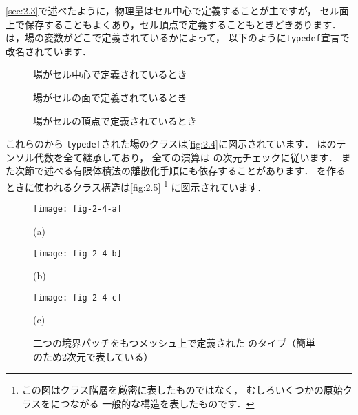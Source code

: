 \autoref{sec:2.3}で述べたように，物理量はセル中心で定義することが主ですが，
セル面上で保存することもよくあり，セル頂点で定義することもときどきあります．
は，場の変数がどこで定義されているかによって，
以下のように\texttt{typedef}宣言で改名されています．
\begin{description}
 \item[] 場がセル中心で定義されているとき
 \item[] 場がセルの面で定義されているとき
% 
 \item[] 場がセルの頂点で定義されているとき
\end{description}

これらのから
\texttt{typedef}された場のクラスは\autoref{fig:2.4}に図示されています．
はのテンソル代数を全て継承しており，
全ての演算は
%
%  
の次元チェックに従います．
また次節で述べる有限体積法の離散化手順にも依存することがあります．
を作るときに使われるクラス構造は\autoref{fig:2.5}%
\footnote{この図はクラス階層を厳密に表したものではなく，
むしろいくつかの原始クラスをにつながる
一般的な構造を表したものです．}%
に図示されています．


\begin{figure}[ht]
 \texttt{[image: fig-2-4-a]}\par
 \medskip
 (a) \par
{}%
 \bigskip
 \texttt{[image: fig-2-4-b]}\par
 \medskip
 (b) \par
{}%
 \bigskip
 \texttt{[image: fig-2-4-c]}\par
 \medskip
 (c) \par
{}%
 \medskip
 \caption{二つの境界パッチをもつメッシュ上で定義された
 のタイプ（簡単のため2次元で表している）}
 \label{fig:2.4}
\end{figure}


